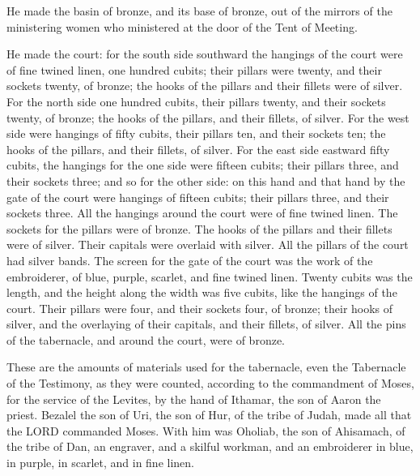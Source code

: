  He made the basin of bronze, and its base of bronze, out of
the mirrors of the ministering women who ministered at the door of the
Tent of Meeting.

 He made the court: for the south side southward the
hangings of the court were of fine twined linen, one hundred cubits;
 their pillars were twenty, and their sockets twenty, of
bronze; the hooks of the pillars and their fillets were of silver.
 For the north side one hundred cubits, their pillars
twenty, and their sockets twenty, of bronze; the hooks of the pillars,
and their fillets, of silver.  For the west side were
hangings of fifty cubits, their pillars ten, and their sockets ten; the
hooks of the pillars, and their fillets, of silver.  For
the east side eastward fifty cubits,  the hangings for the
one side were fifteen cubits; their pillars three, and their sockets
three;  and so for the other side: on this hand and that
hand by the gate of the court were hangings of fifteen cubits; their
pillars three, and their sockets three.  All the hangings
around the court were of fine twined linen.  The sockets
for the pillars were of bronze. The hooks of the pillars and their
fillets were of silver. Their capitals were overlaid with silver. All
the pillars of the court had silver bands.  The screen for
the gate of the court was the work of the embroiderer, of blue, purple,
scarlet, and fine twined linen. Twenty cubits was the length, and the
height along the width was five cubits, like the hangings of the court.
 Their pillars were four, and their sockets four, of
bronze; their hooks of silver, and the overlaying of their capitals, and
their fillets, of silver.  All the pins of the tabernacle,
and around the court, were of bronze.

 These are the amounts of materials used for the
tabernacle, even the Tabernacle of the Testimony, as they were counted,
according to the commandment of Moses, for the service of the Levites,
by the hand of Ithamar, the son of Aaron the priest. 
Bezalel the son of Uri, the son of Hur, of the tribe of Judah, made all
that the LORD commanded Moses.  With him was Oholiab, the
son of Ahisamach, of the tribe of Dan, an engraver, and a skilful
workman, and an embroiderer in blue, in purple, in scarlet, and in fine
linen.

